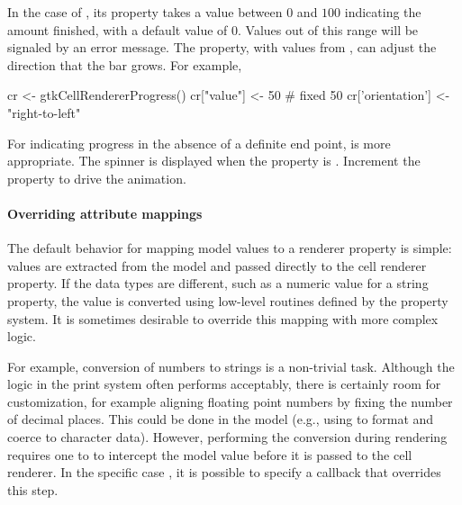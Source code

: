 In the case of , its 
property takes a value between $0$ and $100$ indicating the amount
finished, with a default value of $0$. Values out of this range will
be signaled by an error message.  The  property,
with values from , can adjust the
direction that the bar grows.  For example,

\begin{Schunk}
\begin{Sinput}
 cr <- gtkCellRendererProgress()
 cr["value"] <- 50                       # fixed 50%
 cr['orientation'] <- "right-to-left"
\end{Sinput}
\end{Schunk}

For indicating progress in the absence of a definite end point,
 is more appropriate. The spinner is
displayed when the  property is . Increment
the  property to drive the animation.

\paragraph{Overriding attribute mappings}

The default behavior for mapping model values to a renderer property
is simple: values are extracted from the model and passed directly to
the cell renderer property. If the data types are different, such as a
numeric value for a string property, the value is converted using
low-level routines defined by the property system. It is sometimes
desirable to override this mapping with more complex logic.

For example, conversion of numbers to strings is a non-trivial
task. Although the logic in the \R\/ print system often performs
acceptably, there is certainly room for customization, for example
aligning floating point numbers by fixing the number of decimal
places. This could be done in the model (e.g., using
 to format and coerce to character data). However,
performing the conversion during rendering requires one to to
intercept the model value before it is passed to the cell renderer. In
the specific case , it is possible to specify a
callback that overrides this step.  

